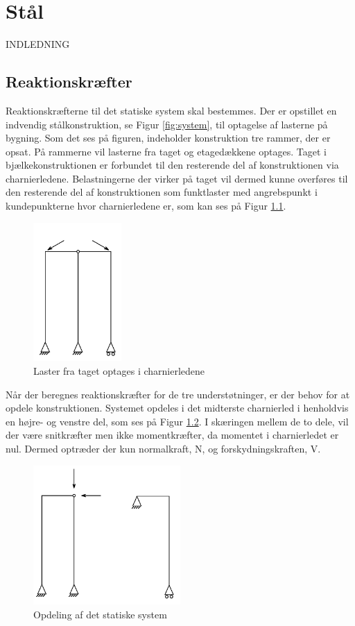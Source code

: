 \chapter{Stål}
INDLEDNING

\section{Reaktionskræfter}
Reaktionskræfterne til det statiske system skal bestemmes. Der er opstillet en indvendig stålkonstruktion, se Figur \ref{fig:system}, til optagelse af lasterne på bygning. Som det ses på figuren, indeholder konstruktion tre rammer, der er opsat. På rammerne vil lasterne fra taget og etagedækkene optages. Taget i bjælkekonstruktionen er forbundet til den resterende del af konstruktionen via charnierledene. Belastningerne der virker på taget vil dermed kunne overføres til den resterende del af konstruktionen som funktlaster med angrebspunkt i kundepunkterne hvor charnierledene er, som kan ses på Figur \ref{fig:del2}. 

\begin{figure}[htbp]
	\centering
	\includegraphics[width=0.3\textwidth]{billeder/delto.png}
	\caption{Laster fra taget optages i charnierledene}
	\label{fig:del2}
\end{figure}

Når der beregnes reaktionskræfter for de tre understøtninger, er der behov for at opdele konstruktionen. Systemet opdeles i det midterste charnierled i henholdvis en højre- og venstre del, som ses på Figur \ref{fig:opdeling}. I skæringen mellem de to dele, vil der være snitkræfter men ikke momentkræfter, da momentet i charnierledet er nul. Dermed optræder der kun normalkraft, N, og forskydningskraften, V.

\begin{figure}[htbp]
	\centering
	\includegraphics[width=0.5\textwidth]{billeder/systemopdeling.png}
	\caption{Opdeling af det statiske system}
	\label{fig:opdeling}
\end{figure}
 
